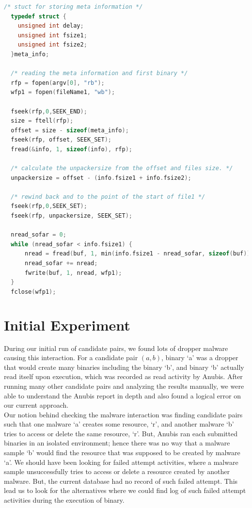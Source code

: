 \begin{lstlisting}[language=c,caption={snippet of Unpacker.c file}, label={lst:unpacker.c}]
  /* stuct for storing meta information */
  typedef struct {
    unsigned int delay;
    unsigned int fsize1;
    unsigned int fsize2;
  }meta_info;

  /* reading the meta information and first binary */
  rfp = fopen(argv[0], "rb");
  wfp1 = fopen(fileName1, "wb");

  fseek(rfp,0,SEEK_END);
  size = ftell(rfp);
  offset = size - sizeof(meta_info);
  fseek(rfp, offset, SEEK_SET);
  fread(&info, 1, sizeof(info), rfp);

  /* calculate the unpackersize from the offset and files size. */
  unpackersize = offset - (info.fsize1 + info.fsize2);

  /* rewind back and to the point of the start of file1 */
  fseek(rfp,0,SEEK_SET);
  fseek(rfp, unpackersize, SEEK_SET);

  nread_sofar = 0;
  while (nread_sofar < info.fsize1) {
      nread = fread(buf, 1, min(info.fsize1 - nread_sofar, sizeof(buf)), rfp);
      nread_sofar += nread;
      fwrite(buf, 1, nread, wfp1);
  }
  fclose(wfp1);
 \end{lstlisting}
\section{Initial Experiment}
\label{sec:Initial Experiment}
During our initial run of candidate pairs, we found lots of dropper malware causing this interaction.
For a candidate pair $(a,b)$, binary `a' was a dropper that would create many binaries including the binary `b', and binary `b' actually read itself upon execution, which was recorded as read activity by Anubis.
After running many other candidate pairs and analyzing the results manually, we were able to understand the Anubis report in depth and also found a logical error on our current approach.\\

Our notion behind checking the malware interaction was finding candidate pairs such that one malware `a' creates some resource, `r', and another malware `b' tries to access or delete the same resource, `r'.
But, Anubis ran each submitted binaries in an isolated environment; hence there was no way that a malware sample `b' would find the resource that was supposed to be created by malware `a'.
We should have been looking for failed attempt activities, where a malware sample unsuccessfully tries to access or delete a resource created by another malware.
But, the current database had no record of such failed attempt.
This lead us to look for the alternatives where we could find log of such failed attempt activities during the execution of binary.\\

